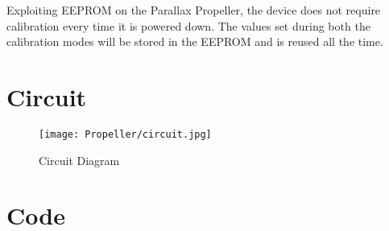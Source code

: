 \documentclass[twoside,11pt,letter]{article}
\begin{document}
\begin{enumerate}
    Exploiting EEPROM on the Parallax Propeller, the device does not require calibration every time it is powered down. The values set during both the calibration modes will be stored in the EEPROM and is reused all the time.
    
\end{enumerate}

\section{Circuit}
\begin{figure}[h!]
        \centering
        \texttt{[image: Propeller/circuit.jpg]}
        \caption{Circuit Diagram}
        \label{fig:circuit}
\end{figure}

\section{Code}
\lstset{style=mystyle}
\end{document}
